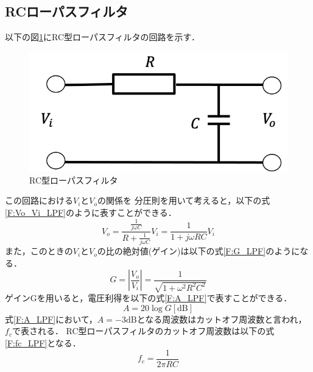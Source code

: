 \documentclass[a4paper,11pt]{jsarticle}
\begin{document}
\subsection{RCローパスフィルタ}
以下の図\ref{RC_LPF}にRC型ローパスフィルタの回路を示す．
\begin{figure}[H]
  \centering
  \includegraphics[width=0.3\linewidth]{picture/RC_LPF.png}
  \caption{RC型ローパスフィルタ}
  \label{RC_LPF}
\end{figure}
この回路における$V_i$と$V_o$の関係を
分圧則を用いて考えると，以下の式\ref{F:Vo_Vi_LPF}のように表すことができる．
\begin{equation}
  V_o = \frac{\frac{1}{j\omega C}}{R+\frac{1}{j\omega C}}V_i = \frac{1}{1+j\omega RC}V_i \label{F:Vo_Vi_LPF}
\end{equation}
また，このときの$V_i$と$V_o$の比の絶対値(ゲイン)は以下の式\ref{F:G_LPF}のようになる．
\begin{equation}
  G = \left|\frac{V_o}{V_i}\right| = \frac{1}{\sqrt{1 + \omega^2R^2C^2}} \label{F:G_LPF}
\end{equation}
ゲインGを用いると，電圧利得を以下の式\ref{F:A_LPF}で表すことができる．
\begin{equation}
  A = 20\log{G} [\si{\deci \bel}]\label{F:A_LPF}
\end{equation}
式\ref{F:A_LPF}において，$A=-3\si{\deci \bel}$となる周波数はカットオフ周波数と言われ，$f_c$で表される．
RC型ローパスフィルタのカットオフ周波数は以下の式\ref{F:fc_LPF}となる．
\begin{equation}
  f_c = \frac{1}{2\pi RC} \label{F:fc_LPF}
\end{equation}
\end{document}
